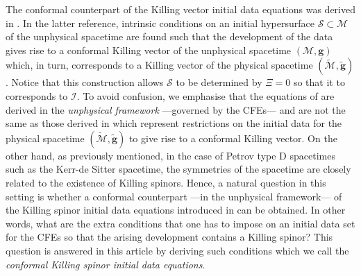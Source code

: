 \documentclass[10pt,a4paper]{article}
\theoremstyle{plain}
\def\bmg{{\bm g}}
\newcounter{mnotecount}%
\newcommand{\mnotex}[1]%
{\protect{\stepcounter{mnotecount}}$^{\mbox{\footnotesize $\bullet$\themnotecount}}$ 
\marginpar{%
\raggedright\tiny\em
$\!\!\!\!\!\!\,\bullet$\themnotecount: #1} }
\begin{document}
The conformal counterpart of the Killing vector initial data equations
\cite{BeiChr97b} was derived in \cite{Pae14a}.  In the latter
reference, intrinsic conditions on an initial hypersurface
$\mathcal{S}\subset \mathcal{M}$ of the unphysical spacetime are found
such that the development of the data gives rise to a conformal
Killing vector of the unphysical spacetime $(\mathcal{M},\bmg)$ which,
in turn, corresponds to a Killing vector of the physical spacetime
$(\tilde{\mathcal{M}},\tilde{\bmg})$.  Notice that this construction
allows $\mathcal{S}$ to be determined by $\Xi=0$ so that it to
corresponds to $\mathscr{I}$.  To avoid confusion, we emphasise that
the equations of \cite{Pae14a} are derived in the \emph{unphysical
framework} ---governed by the CFEs---
and are not the same as those derived in \cite{GarKha19} which
represent restrictions on the initial data for the physical spacetime
$(\tilde{\mathcal{M}},\tilde{\bmg})$ to give rise to a conformal
Killing vector.
On the other hand, as previously mentioned, in the case of Petrov type
D spacetimes such as the Kerr-de Sitter spacetime, the symmetries of
the spacetime are closely related to the existence of Killing spinors.
Hence, a natural question in this setting is whether a conformal
counterpart ---in the unphysical framework--- of the Killing spinor
initial data equations introduced in \cite{GarVal08c} can be
obtained. In other words, what are the extra conditions that one has
to impose on an initial data set for the CFEs so that the arising
development contains a Killing spinor?  This question is answered in
this article by deriving such conditions which we call the
\emph{conformal Killing spinor initial data equations}.

\medskip
\end{document}
